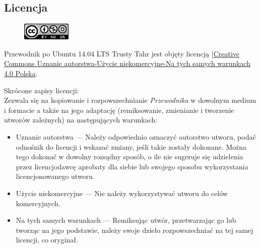 \subsection{Licencja}
\begin{figure}
	\vspace{-10pt}
	\includegraphics[width=\linewidth]{images/CC.png}
\end{figure}

Przewodnik po Ubuntu 14.04 LTS Trusty Tahr jest objęty licencją [\href{http://creativecommons.org/licenses/by-nc-sa/3.0/pl/}{Creative Commons Uznanie autorstwa-Użycie niekomercyjne-Na tych samych warunkach 4.0 Polska}.

Skrócone zapisy licencji:\\
Zezwala się na kopiowanie i rozpowszechnianie \textit{Przewodnika} w dowolnym medium i formacie a także na jego adaptację (remiksowanie, zmienianie i tworzenie utworów zależnych) na następujących warunkach:
\begin{itemize}
\item Uznanie autorstwa --- Należy odpowiednio oznaczyć autorstwo utworu, podać odnośnik do licencji i wskazać zmiany, jeśli takie zostały dokonane. Można tego dokonać w dowolny rozsądny sposób, o ile nie sugeruje się udzielenia przez licencjodawcę aprobaty dla siebie lub swojego sposobu wykorzystania licencjonowanego utworu.
\item Użycie niekomercyjne --- Nie należy wykorzystywać utworu do celów komercyjnych.
\item Na tych samych warunkach --- Remiksując utwór, przetwarzając go lub tworząc na jego podstawie, należy swoje dzieło rozpowszechniać na tej samej licencji, co oryginał. 
\end{itemize}